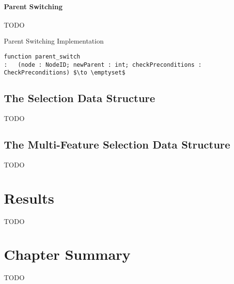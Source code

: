 \paragraph{Parent Switching}

TODO

\begin{stulisting}[p]
\caption{Parent Switching Implementation}
\label{code:ipfs-forest-parentswitch}
\begin{lstlisting}[style=Default]
function parent_switch
:	(node : NodeID; newParent : int; checkPreconditions : CheckPreconditions) $\to \emptyset$
\end{lstlisting}
\end{stulisting}

\subsection{The Selection Data Structure}

TODO

\subsection{The Multi-Feature Selection Data Structure}

TODO

\section{Results}

TODO

\section{Chapter Summary}

TODO

